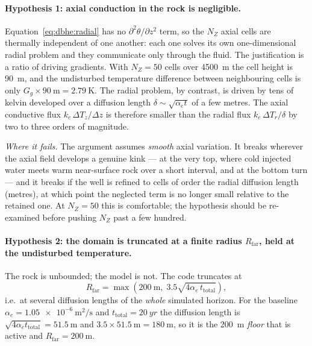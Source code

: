 \documentclass[11pt]{article}
\begin{document}
\paragraph{Hypothesis 1: axial conduction in the rock is negligible.}
Equation~\eqref{eq:dbhe:radial} has no $\partial^2\theta/\partial z^2$ term, so
the $N_Z$ axial cells are thermally independent of one another: each one solves
its own one-dimensional radial problem and they communicate only through the
fluid. The justification is a ratio of driving gradients. With $N_Z=50$ cells
over \SI{4500}{\metre} the cell height is \SI{90}{\metre}, and the undisturbed
temperature difference between neighbouring cells is only
$G_g\times\SI{90}{\metre}=\SI{2.79}{\kelvin}$. The radial problem, by contrast,
is driven by tens of kelvin developed over a diffusion length
$\delta\sim\sqrt{\alpha_e t}$ of a few metres. The axial conductive flux
$k_e\,\Delta T_z/\Delta z$ is therefore smaller than the radial flux
$k_e\,\Delta T_r/\delta$ by two to three orders of magnitude.

\emph{Where it fails.} The argument assumes \emph{smooth} axial variation. It
breaks wherever the axial field develops a genuine kink --- at the very top,
where cold injected water meets warm near-surface rock over a short interval,
and at the bottom turn --- and it breaks if the well is refined to cells of order
the radial diffusion length (metres), at which point the neglected term is no
longer small relative to the retained one. At $N_Z=50$ this is comfortable; the
hypothesis should be re-examined before pushing $N_Z$ past a few hundred.

\paragraph{Hypothesis 2: the domain is truncated at a finite radius
$R_{\mathrm{far}}$, held at the undisturbed temperature.}
The rock is unbounded; the model is not. The code truncates at
\begin{equation}
R_{\mathrm{far}}=\max\!\left(\SI{200}{\metre},\;
3.5\sqrt{4\alpha_e\,t_{\mathrm{total}}}\right),
\label{eq:dbhe:Rfar}
\end{equation}
i.e.\ at several diffusion lengths of the \emph{whole} simulated horizon. For
the baseline $\alpha_e=\SI{1.05e-6}{\metre\squared\per\second}$ and
$t_{\mathrm{total}}=\SI{20}{yr}$ the diffusion length is
$\sqrt{4\alpha_e t_{\mathrm{total}}}=\SI{51.5}{\metre}$ and
$3.5\times\SI{51.5}{\metre}=\SI{180}{\metre}$, so it is the
\SI{200}{\metre} \emph{floor} that is active and $R_{\mathrm{far}}=\SI{200}{\metre}$.
\end{document}
